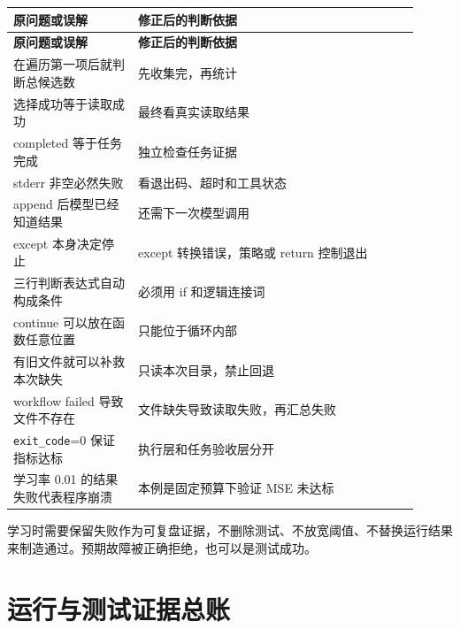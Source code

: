\documentclass[UTF8,zihao=-4,fontset=fandol]{ctexart}
\begin{document}
{\small\setlength{\tabcolsep}{4pt}
\renewcommand{\arraystretch}{1.25}
\begin{longtable}{>{\raggedright\arraybackslash}p{0.28\linewidth}>{\raggedright\arraybackslash}p{0.63\linewidth}}
\toprule
\textbf{原问题或误解} & \textbf{修正后的判断依据} \\
\midrule\endfirsthead
\toprule
\textbf{原问题或误解} & \textbf{修正后的判断依据} \\
\midrule\endhead
\bottomrule\endfoot
在遍历第一项后就判断总候选数 & 先收集完，再统计 \\
选择成功等于读取成功 & 最终看真实读取结果 \\
completed 等于任务完成 & 独立检查任务证据 \\
stderr 非空必然失败 & 看退出码、超时和工具状态 \\
append 后模型已经知道结果 & 还需下一次模型调用 \\
except 本身决定停止 & except 转换错误，策略或 return 控制退出 \\
三行判断表达式自动构成条件 & 必须用 if 和逻辑连接词 \\
continue 可以放在函数任意位置 & 只能位于循环内部 \\
有旧文件就可以补救本次缺失 & 只读本次目录，禁止回退 \\
workflow failed 导致文件不存在 & 文件缺失导致读取失败，再汇总失败 \\
\nolinkurl{exit_code}=0 保证指标达标 & 执行层和任务验收层分开 \\
学习率 0.01 的结果失败代表程序崩溃 & 本例是固定预算下验证 MSE 未达标 \\
\end{longtable}}

学习时需要保留失败作为可复盘证据，不删除测试、不放宽阈值、不替换运行结果来制造通过。预期故障被正确拒绝，也可以是测试成功。

\section{运行与测试证据总账}
\end{document}
